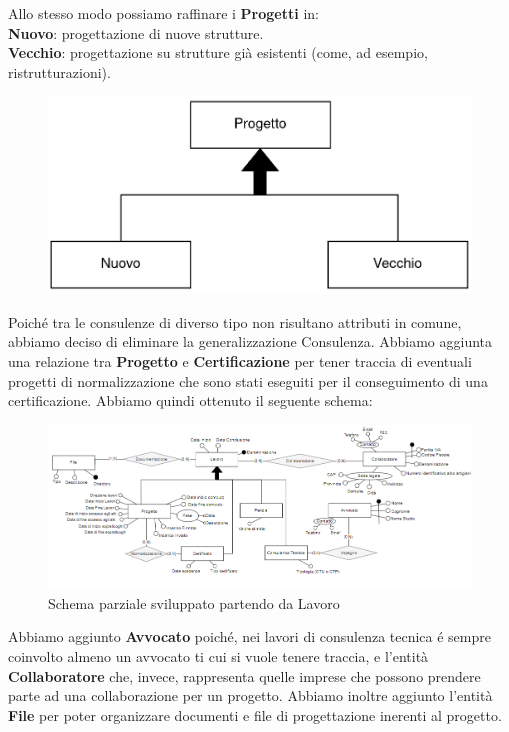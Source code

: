 \documentclass{elegantbook}
\begin{document}
            Allo stesso modo possiamo raffinare i \textbf{Progetti} in:\\
            \textbf{Nuovo}: progettazione di nuove strutture.\\
            \textbf{Vecchio}: progettazione su strutture già esistenti (come, ad esempio, ristrutturazioni).\\
            
            \begin{figure}[H]
                \includegraphics[scale=0.4]{../Img/DBSchemes/lavoro-2.png} 
            \end{figure}

           	Poiché tra le consulenze di diverso tipo non risultano attributi in comune, abbiamo deciso di eliminare la generalizzazione Consulenza. Abbiamo aggiunta una relazione tra \textbf{Progetto} e \textbf{Certificazione} per tener traccia di eventuali progetti di normalizzazione che sono stati eseguiti per il conseguimento di una certificazione.
           	Abbiamo quindi ottenuto il seguente schema:

            \begin{figure}[H]
                \includegraphics[scale=0.7]{../Img/DBSchemes/lavoro-completo.png} 
                \caption{Schema parziale sviluppato partendo da Lavoro}
            \end{figure}

            Abbiamo aggiunto \textbf{Avvocato} poiché, nei lavori di consulenza tecnica é sempre coinvolto almeno un avvocato ti cui si vuole tenere traccia, e l'entità \textbf{Collaboratore}
            che, invece, rappresenta quelle imprese che possono prendere parte ad una collaborazione per un progetto.
            Abbiamo inoltre aggiunto l'entità \textbf{File} per poter organizzare documenti e file di progettazione inerenti al progetto.
            
\end{document}
